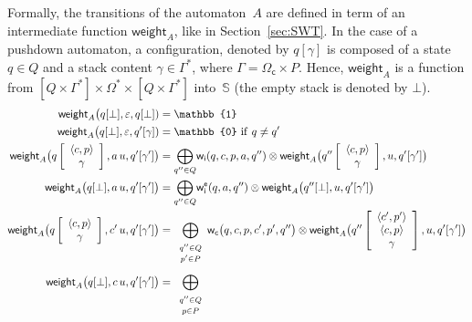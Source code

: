\documentclass[runningheads]{llncs}
\def\<#1>{\langle #1 \rangle}
\newcommand{\config}[2]{\ensuremath{#1}[{#2}]}
\newcommand{\configup}[2]{\ensuremath{#1}\left[\begin{array}{c} #2 \end{array}\right]}
\def\stackup{\\}
\newcommand{\Semiring}{\mathbb{S}}
\newcommand{\zero}{\mathbb{0}}
\newcommand{\one}{\mathbb{1}}
\def\weight{\mathsf{weight}}
\def\wei{\mathsf{w}}
\newcommand{\call}[1]{\ensuremath #1} %
\def\Omegac{{\Omega_\mathsf{c}}}
\def\weii{{\wei_\mathsf{i}}}
\def\weic{{\wei_\mathsf{c}}}
\def\weiei{{\wei^\mathsf{e}_\mathsf{i}}}
\begin{document}
Formally, the transitions of the automaton~$A$ are defined
in term of %
an intermediate function $\weight_A$, like in Section~\ref{sec:SWT}.
In the case of a pushdown automaton, a configuration, denoted by $q[\gamma]$ 
is composed of a state $q \in Q$ 
and a stack content $\gamma \in \Gamma^*$, 
where $\Gamma = \Omegac \times P$.
Hence, $\weight_A$ is a function from 
$[Q \times \Gamma^*] \times \Omega^* \times [Q \times \Gamma^*]$ into~$\Semiring$
(the empty stack is denoted by $\bot$). 
%
\begin{align}
\weight_A\bigl(\config{q}{\bot}, \varepsilon, \config{q}{\bot}) & = \one\label{eq:SWVPA-weight}\\
\weight_A\bigl(\config{q}{\bot}, \varepsilon, \config{q'}{\gamma}) & = \zero 
\mathrm{~if~} q \neq q'\nonumber\\
\weight_A\bigl(\configup{q}{\<{\call{c}}, p>\stackup\gamma}, a\, u, 
               \config{q'}{\gamma'}\bigr) & =  
 {\displaystyle\bigoplus_{q'' \in Q}} \weii(q, c, p, a, q'') 
  \otimes \weight_A\bigl(\configup{q''}{\<{\call{c}}, p> \stackup \gamma}, u, 
                         \config{q'}{\gamma'}\bigr)\nonumber\\
\weight_A\bigl(\config{q}{\bot}, a\, u, 
               \config{q'}{\gamma'}\bigr) & =  
  {\displaystyle\bigoplus_{q'' \in Q}} \weiei(q, a, q'') 
   \otimes \weight_A\bigl(\config{q''}{\bot}, u, \config{q'}{\gamma'}\bigr)\nonumber\\
%
\weight_A\bigl(\configup{q}{\<{\call{c}}, p>\stackup\gamma}, {\call{c}'}\, u, 
               \config{q'}{\gamma'}\bigr) & =  
 {\displaystyle\bigoplus_{\begin{array}{c}
                          \scriptstyle q'' \in Q\\[-2pt]
                          \scriptstyle p' \in P
                          \end{array}}}
 \weic\bigl(q, {\call{c}}, p, {\call{c}'}, p', q''\bigr) 
 \otimes \weight_A\bigl(\configup{q''}{\<{\call{c}'}, p'>\stackup \<{\call{c}}, p>\stackup \gamma}, u, 
                        \config{q'}{\gamma'}\bigr)\nonumber\\[1mm]
%
\weight_A\bigl(\config{q}{\bot}, {\call{c}}\, u, 
               \config{q'}{\gamma'}\bigr) & =  
 {\displaystyle\bigoplus_{\begin{array}{c}
                          \scriptstyle q'' \in Q\\[-2pt]
                          \scriptstyle p \in P

\end{array}}}
\end{align}
\end{document}
